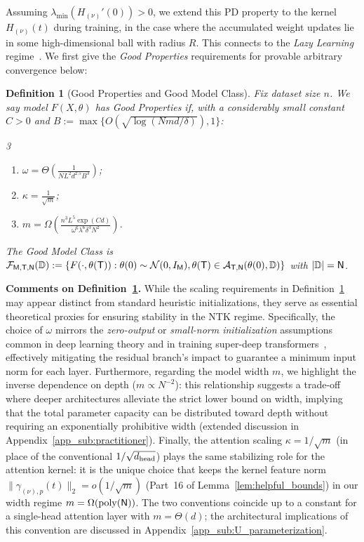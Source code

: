 \documentclass[11pt]{article}
\theoremstyle{plain}
\newtheorem{definition}[theorem]{Definition}
\DeclareMathOperator{\poly}{poly}
\begin{document}
 Assuming $\lambda_{\min}(H_{(\nu)}'(0)) > 0$, we extend this PD property to the kernel $H_{(\nu)}(t)$ during training, in the case where the accumulated weight updates lie in some high-dimensional ball with radius $R$. This connects to the {\it Lazy Learning} regime~\citep{jgh18, dzps19}. We first give the {\it Good Properties} requirements for provable arbitrary convergence below:
\begin{definition}[Good Properties and Good Model Class]\label{def:gd}
    Fix dataset size $n$. We say model $F(X,\theta)$ has Good Properties if, with a considerably small constant $C>0$ and $B := \max\{O(\sqrt{\log(Nmd/\delta)}), 1\}$:
    \begin{multicols}{3}
        \begin{enumerate}
        \item $\omega = \Theta(\frac{1}{N L^2d^{2.5}B^3})$;
        \item $\kappa = \frac{1}{\sqrt{m}}$;
        \item $m = \Omega(\frac{n^3L^5\exp(Cd)}{\omega^6\lambda^6\delta^3 N^{2}})$.
        \end{enumerate}
    \end{multicols}
    The Good Model Class is ${\cal F}_{\sf M, T, N}(\mathbb{D}):= \{F(\cdot, \theta({\sf T})) : \theta(0) \sim \mathcal{N}(0, I_{\sf M}), \theta({\sf T}) \in {\cal A}_{{\sf T},{\sf N}}(\theta(0), \mathbb{D})\}$ with $|\mathbb{D}|={\sf N}$.
\end{definition}

{\bf Comments on Definition~\ref{def:gd}.} While the scaling requirements in Definition~\ref{def:gd} may appear distinct from standard heuristic initializations, they serve as essential theoretical proxies for ensuring stability in the NTK regime. Specifically, the choice of $\omega$ mirrors the {\it zero-output} or {\it small-norm initialization} assumptions common in deep learning theory and in training super-deep transformers~\citep{bmm+21, zdm19, wmd+22}, effectively mitigating the residual branch's impact to guarantee a minimum input norm for each layer. Furthermore, regarding the model width $m$, we highlight the inverse dependence on depth ($m \propto N^{-2}$): this relationship suggests a trade-off where deeper architectures alleviate the strict lower bound on width, implying that the total parameter capacity can be distributed toward depth without requiring an exponentially prohibitive width (extended discussion in Appendix~\ref{app_sub:practitioner}). Finally, the attention scaling $\kappa = 1/\sqrt{m}$ (in place of the conventional $1/\sqrt{d_{\rm head}}$) plays the same stabilizing role for the attention kernel: it is the unique choice that keeps the kernel feature norm $\|\gamma_{(\nu),p}(t)\|_2 = o(1/\sqrt m)$ (Part~16 of Lemma~\ref{lem:helpful_bounds}) in our width regime $m = \Omega(\poly({\sf N}))$. The two conventions coincide up to a constant for a single-head attention layer with $m=\Theta(d)$; the architectural implications of this convention are discussed in Appendix~\ref{app_sub:U_parameterization}.
\end{document}
